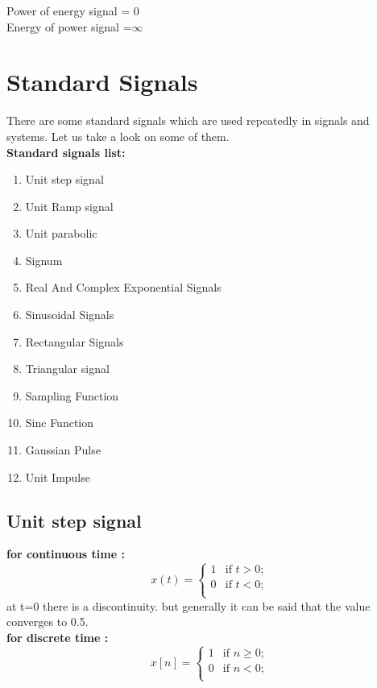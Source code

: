 \documentclass[a4paper,12pt]{book}
\begin{document}
Power of energy signal = 0\\
Energy of power signal =$\infty$

\endgroup
\pagebreak
\section{Standard Signals}
There are some standard signals which are used repeatedly in signals and systems. Let us take a look on some of them.\vspace{4mm}\\
{\bf Standard signals list:}
\begin{enumerate}
\item Unit step signal
\item Unit Ramp signal
\item Unit parabolic
\item Signum
\item Real And Complex Exponential Signals
\item Sinusoidal Signals
\item Rectangular Signals
\item Triangular signal
\item Sampling Function
\item Sinc Function
\item Gaussian Pulse
\item Unit Impulse
\end{enumerate}

\subsection*{Unit step signal}
{\bf for continuous time :}\\
	\[ x(t) = \left\{ \begin{array}{ll}

	1 & \mbox{if $t > 0$;} \\

	0 & \mbox{if $t < 0$;} \\

	\end{array}
	\right. \]
at t=0 there is a discontinuity. but generally it can be said that the value converges to 0.5.\\
\bigskip
{\bf for discrete time :}\\
	\[ x[n] = \left\{ \begin{array}{ll}

	1 & \mbox{if $n \geq 0$;} \\

	0 & \mbox{if $n < 0$;} \\

	\end{array}
	\right. \]
\end{document}
